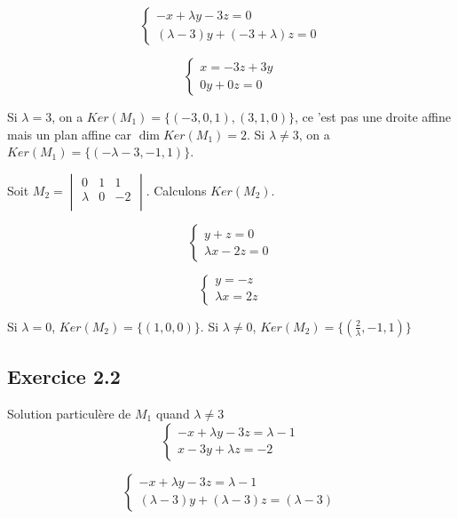 \documentclass[]{book}
\theoremstyle{definition}
\begin{document}
$$
\left\{ 
    \begin{array}{l}
        -x + \lambda y - 3 z = 0 \\
        (\lambda - 3) y + (-3 +\lambda) z = 0
    \end{array}
\right.
$$

$$
\left\{ 
    \begin{array}{l}
        x  = -3z+3y \\
        0y + 0z= 0
    \end{array}
\right.
$$

Si $\lambda = 3$, on a $Ker(M_1) = \{(-3, 0, 1), (3, 1, 0)\}$, ce 'est pas une droite affine mais un plan affine car $\dim Ker(M_1) = 2$. Si $\lambda \neq 3$, on a $Ker(M_1) = \{(-\lambda -3, -1, 1)\}$. 

Soit $M_2=\begin{vmatrix}
    0 & 1 & 1 \\
    \lambda & 0 & -2 \\
\end{vmatrix}$. Calculons $Ker(M_2)$.

$$
\left\{ 
    \begin{array}{l}
        y + z = 0 \\
        \lambda x - 2 z = 0
    \end{array}
\right.
$$

$$
\left\{ 
    \begin{array}{l}
        y = -z \\
        \lambda x = 2 z
    \end{array}
\right.
$$

Si $\lambda = 0$, $Ker(M_2) =\{(1,0,0) \}$. Si $\lambda \neq 0$, $Ker(M_2) =\{(\frac{2}{\lambda},-1,1) \}$

\subsection*{Exercice 2.2}
Solution particul\`ere de $M_1$ quand $\lambda \neq 3$
$$
\left\{ 
    \begin{array}{l}
        -x + \lambda y - 3 z = \lambda - 1 \\
        x - 3 y + \lambda z = -2
    \end{array}
\right.
$$

$$
\left\{ 
    \begin{array}{l}
        -x + \lambda y - 3 z = \lambda - 1 \\
        (\lambda - 3) y + (\lambda - 3) z = (\lambda - 3)
    \end{array}
\right.
$$
\end{document}
